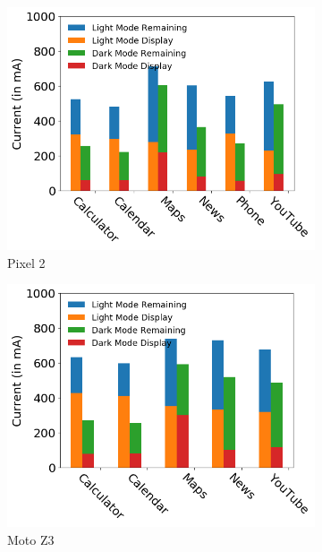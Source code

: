 \begin{figure}[]
	\begin{subfigure}[]{0.32\textwidth}
		\includegraphics[width=\textwidth]{figure/002_Pixel2_case_study.png}
        \vspace{-0.2in}
		\caption{Pixel 2}
	\end{subfigure}
	\begin{subfigure}[]{0.32\textwidth}
		\includegraphics[width=\textwidth]{figure/003_MotoZ3_case_study.png}
        \vspace{-0.2in}
		\caption{Moto Z3}
	\end{subfigure}
	\begin{subfigure}[]{0.32\textwidth}

\end{subfigure}
\end{figure}
